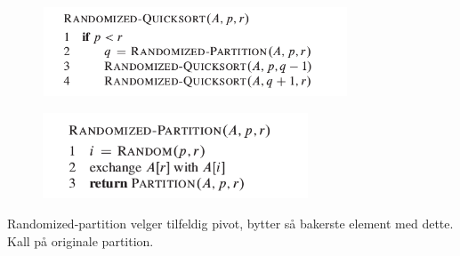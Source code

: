\documentclass[12pt]{report}
\begin{document}
\vspace{\baselineskip}
\begin{multicols}{2}



\begin{figure}[H]
	\begin{Center}
		\includegraphics[width=3.57in,height=1.04in]{./media/image28.png}
	\end{Center}
\end{figure}



\par




\begin{figure}[H]
	\begin{Center}
		\includegraphics[width=3.1in,height=1.01in]{./media/image29.png}
	\end{Center}
\end{figure}



\par


\vspace{\baselineskip}

\end{multicols}

\vspace{\baselineskip}
Randomized-partition velger tilfeldig pivot, bytter så bakerste element med dette. Kall på originale partition.\par

 \par
\end{document}
